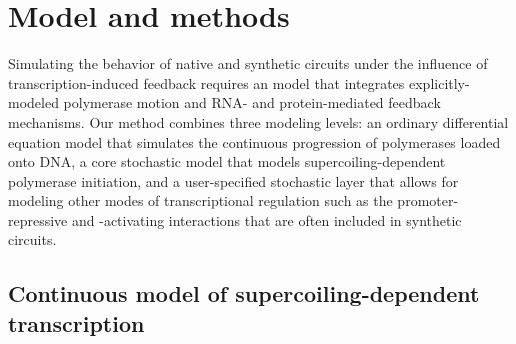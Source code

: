\documentclass[11pt]{article}
\begin{document}
\FloatBarrier
\section{Model and methods}
Simulating the behavior of native and synthetic circuits under the influence of transcription-induced feedback requires an model that integrates explicitly-modeled polymerase motion and RNA- and protein-mediated feedback mechanisms.
Our method combines three modeling levels: an ordinary differential equation model that simulates the continuous progression of polymerases loaded onto DNA, a core stochastic model that models supercoiling-dependent polymerase initiation, and a user-specified stochastic layer that allows for modeling other modes of transcriptional regulation such as the promoter-repressive and -activating interactions that are often included in synthetic circuits.

\subsection{Continuous model of supercoiling-dependent transcription}
\end{document}
